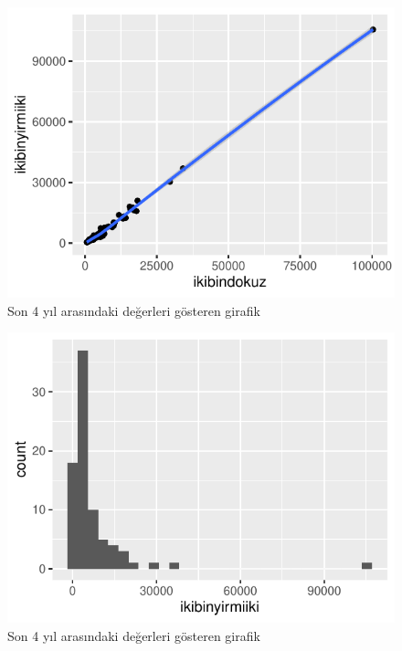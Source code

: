 \documentclass[
  12pt,
]{article}
\begin{document}
\begin{figure}

{\centering \includegraphics{final_files/figure-latex/plot-1} 

}

\caption{Son 4 yıl arasındaki değerleri gösteren girafik}\label{fig:plot-1}
\end{figure}
\begin{figure}

{\centering \includegraphics{final_files/figure-latex/plot-2} 

}

\caption{Son 4 yıl arasındaki değerleri gösteren girafik}\label{fig:plot-2}
\end{figure}
\end{document}
